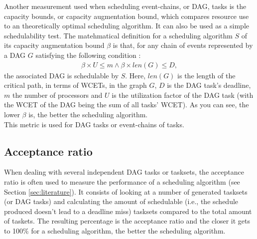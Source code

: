 Another measurement used when scheduling event-chains, or DAG, tasks  
is the capacity bounds, or capacity augmentation bound,
which compares resource use to an theoretically optimal scheduling algorithm.
It can also be used as a simple schedulability test.
The matehmatical definition for a scheduling algorithm $S$ of its capacity
augmentation bound $\beta$ is that, for any chain of events represented by a DAG $G$
satisfying the following condition :
\begin{align}
    \beta \times U \leq m \wedge  \beta \times len(G) \leq D,
\end{align}
the associated DAG is schedulable by $S$.
Here, $len(G)$ is the length of the critical path, in terms of WCETs,
in the graph $G$, $D$ is the DAG task's deadline, $m$ the number of processors and $U$
is the utilization factor of the DAG task (with the WCET of the DAG being the sum of all tasks' WCET).
As you can see, the lower $\beta$ is, the better the scheduling algorithm.\\
This metric is used for DAG tasks or event-chains of tasks.

%
%

\subsection{Acceptance ratio}

When dealing with several independent DAG tasks
or tasksets, 
the acceptance ratio is often used to measure the 
performance of a scheduling algorithm (see Section \ref{sec:literature}).
It consists of looking at a number of generated tasksets (or DAG tasks)
and calculating the amount of schedulable (i.e., 
the schedule produced doesn't lead to a deadline miss) tasksets compared to 
the total amount of taskets.
The resulting percentage is the acceptance ratio 
and the closer it gets to 100\% for a scheduling algorithm, the better the scheduling algorithm.

